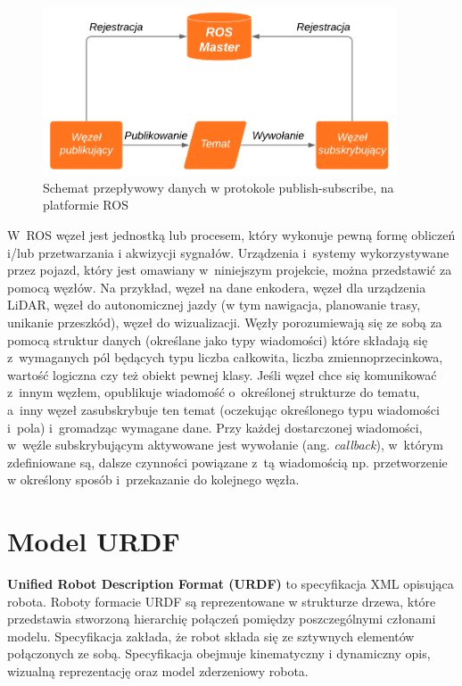 \begin{figure}
  \centering
  \includegraphics[width=105mm]{graphics/ROSflow.png}
\caption{Schemat przepływowy danych w protokole publish-subscribe, na
platformie ROS}
  \label{fig:pubsub}
\end{figure}

W~ROS węzeł jest jednostką lub procesem, który wykonuje pewną formę obliczeń
i/lub przetwarzania i akwizycji sygnałów.
Urządzenia i~systemy wykorzystywane przez pojazd, który jest omawiany
w~niniejszym projekcie, można przedstawić za pomocą węzłów.
Na przykład, węzeł na dane enkodera, węzeł dla urządzenia LiDAR,
węzeł do autonomicznej jazdy (w tym nawigacja, planowanie trasy, unikanie
przeszkód), węzeł do wizualizacji.
Węzły porozumiewają się ze sobą za pomocą struktur danych (określane jako typy
wiadomości) które składają się z~wymaganych pól będących typu liczba całkowita,
liczba zmiennoprzecinkowa, wartość logiczna czy też obiekt pewnej klasy.
Jeśli węzeł chce się komunikować z~innym węzłem, opublikuje wiadomość
o~określonej strukturze do tematu, a~inny węzeł zasubskrybuje ten temat
(oczekując określonego typu wiadomości i~pola) i~gromadząc wymagane dane.
Przy każdej dostarczonej wiadomości, w~węźle subskrybującym aktywowane jest
wywołanie (ang. \textit{callback}), w~którym zdefiniowane są, dalsze czynności
powiązane z~tą wiadomością np. przetworzenie w określony sposób i~przekazanie
do kolejnego węzła.

\section{Model URDF}
\textbf{Unified Robot Description Format (URDF)} to specyfikacja XML opisująca
robota. Roboty formacie URDF są reprezentowane w strukturze drzewa, które
przedstawia stworzoną hierarchię połączeń pomiędzy poszczególnymi członami
modelu. Specyfikacja zakłada, że robot składa się ze sztywnych elementów
połączonych ze sobą. Specyfikacja obejmuje kinematyczny i dynamiczny opis,
wizualną reprezentację oraz model zderzeniowy robota.

